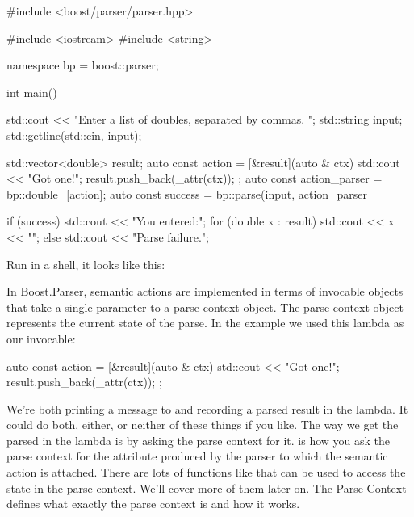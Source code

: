 \documentclass{MyBook}
\begin{document}
\begin{code}
#include <boost/parser/parser.hpp>

#include <iostream>
#include <string>


namespace bp = boost::parser;

int main()
{
    std::cout << "Enter a list of doubles, separated by commas. ";
    std::string input;
    std::getline(std::cin, input);

    std::vector<double> result;
    auto const action = [&result](auto & ctx) {
        std::cout << "Got one!\n";
        result.push_back(_attr(ctx));
    };
    auto const action_parser = bp::double_[action];
    auto const success = bp::parse(input, action_parser %

    if (success) {
        std::cout << "You entered:\n";
        for (double x : result) {
            std::cout << x << "\n";
        }
    } else {
        std::cout << "Parse failure.\n";
    }
}
\end{code}

Run in a shell, it looks like this:


In Boost.Parser, semantic actions are implemented in terms of invocable objects that take a single parameter to a parse-context object. The parse-context object represents the current state of the parse. In the example we used this lambda as our invocable:

\begin{code}
auto const action = [&result](auto & ctx) {
    std::cout << "Got one!\n";
    result.push_back(_attr(ctx));
};
\end{code}

We're both printing a message to  and recording a parsed result in the lambda. It could do both, either, or neither of these things if you like. The way we get the parsed  in the lambda is by asking the parse context for it.  is how you ask the parse context for the attribute produced by the parser to which the semantic action is attached. There are lots of functions like  that can be used to access the state in the parse context. We'll cover more of them later on. The Parse Context defines what exactly the parse context is and how it works.
\end{document}
